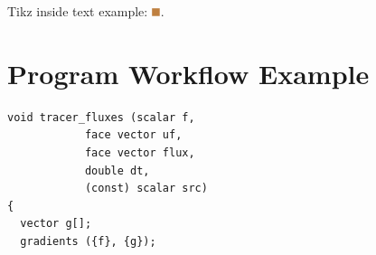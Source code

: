 \documentclass[a4paper]{article}
\newcommand{\para}[1]{\textbf{\emph{\textcolor{para}{#1}}}}
\newcommand{\testA}{\tikz \fill[brown] (2pt,2pt) rectangle (8pt,8pt);}
\begin{document}
Tikz inside text example: $\testA$.

\section{Program Workflow Example}
\vspace{1mm}
\begin{multicols}{2}
 \columnbreak
 \begin{verbatim}
void tracer_fluxes (scalar f,
		    face vector uf,
		    face vector flux,
		    double dt,
		    (const) scalar src)
{
  vector g[];
  gradients ({f}, {g});
 \end{verbatim}
\end{multicols}

\begin{center}
\end{center}

\printbibliography
\end{document}
